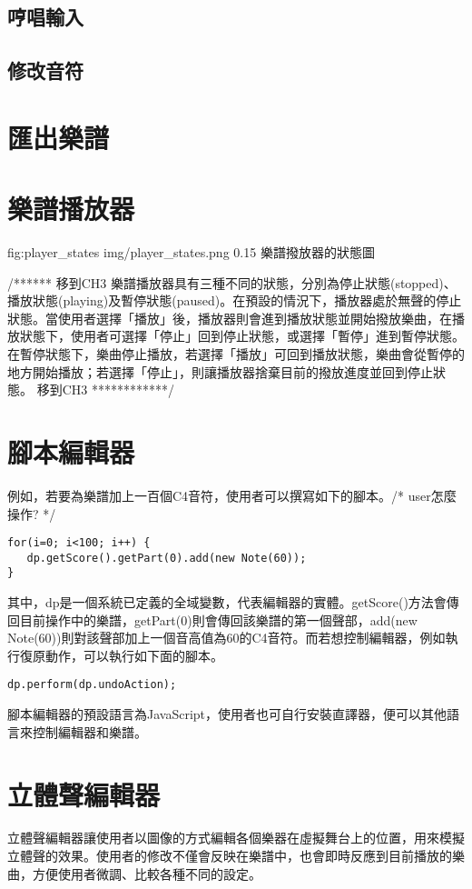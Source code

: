 \documentclass[12pt,a4paper,oneside]{report}
\begin{document}
   \subsection{哼唱輸入}
   \subsection{修改音符}
\section{匯出樂譜}
\section{樂譜播放器}

\figurewithcaption
{fig:player_states}
{img/player_states.png}
{0.15}
{樂譜撥放器的狀態圖}

/****** 移到CH3  
樂譜播放器具有三種不同的狀態，分別為停止狀態(stopped)、播放狀態(playing)及暫停狀態(paused)。在預設的情況下，播放器處於無聲的停止狀態。當使用者選擇「播放」後，播放器則會進到播放狀態並開始撥放樂曲，在播放狀態下，使用者可選擇「停止」回到停止狀態，或選擇「暫停」進到暫停狀態。在暫停狀態下，樂曲停止播放，若選擇「播放」可回到播放狀態，樂曲會從暫停的地方開始播放；若選擇「停止」，則讓播放器捨棄目前的撥放進度並回到停止狀態。
 移到CH3  ************/  

\section{腳本編輯器}

例如，若要為樂譜加上一百個C4音符，使用者可以撰寫如下的腳本。/* user怎麼操作? */

\begin{lstlisting}
for(i=0; i<100; i++) { 
   dp.getScore().getPart(0).add(new Note(60));
}
\end{lstlisting}

其中，dp是一個系統已定義的全域變數，代表編輯器的實體。getScore()方法會傳回目前操作中的樂譜，getPart(0)則會傳回該樂譜的第一個聲部，add(new Note(60))則對該聲部加上一個音高值為60的C4音符。而若想控制編輯器，例如執行復原動作，可以執行如下面的腳本。

\begin{verbatim}
dp.perform(dp.undoAction);
\end{verbatim}

腳本編輯器的預設語言為JavaScript，使用者也可自行安裝直譯器，便可以其他語言來控制編輯器和樂譜。

\section{立體聲編輯器}
立體聲編輯器讓使用者以圖像的方式編輯各個樂器在虛擬舞台上的位置，用來模擬立體聲的效果。使用者的修改不僅會反映在樂譜中，也會即時反應到目前播放的樂曲，方便使用者微調、比較各種不同的設定。
\end{document}
